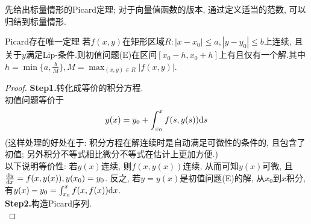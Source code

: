 先给出标量情形的Picard定理; 对于向量值函数的版本, 通过定义适当的范数, 可以归结到标量情形.
\begin{theorem}{Picard存在唯一定理}{}
    若$f(x,y)$在矩形区域$R:|x-x_0|\leq a,|y-y_0|\leq b$上连续, 且关于$y$满足Lip-条件.则初值问题(E)在区间$[x_0-h,x_0+h]$上有且仅有一个解.其中$h=\min\{a,\frac{b}{M}\},M=\max_{(x,y)\in R}|f(x,y)|$.
\end{theorem}
\begin{proof}\newline
    \textbf{Step1.}转化成等价的积分方程.\\
    初值问题等价于
    $$y(x)=y_0+\int_{x_0}^{x}f(s,y(s)){\rm d}s$$
    (这样处理的好处在于: 积分方程在解连续时是自动满足可微性的条件的, 且包含了初值; 另外积分不等式相比微分不等式在估计上更加方便.)\\
    以下说明等价性:
    若$y(x)$连续, 则$f(x,y(x))$连续, 从而可知$y(x)$可微, 且$\frac{{\rm d}y}{{\rm d}x}=f(x,y(x)),y(x_0)=y_0$.
    反之, 若$y=y(x)$是初值问题(E)的解, 从$x_0$到$x$积分, 有$y(x)-y_0=\int_{x_0}^{x}f(x,f(x)){\rm d}x$.
    \\ \textbf{Step2.}构造Picard序列.\\
    

\end{proof}
